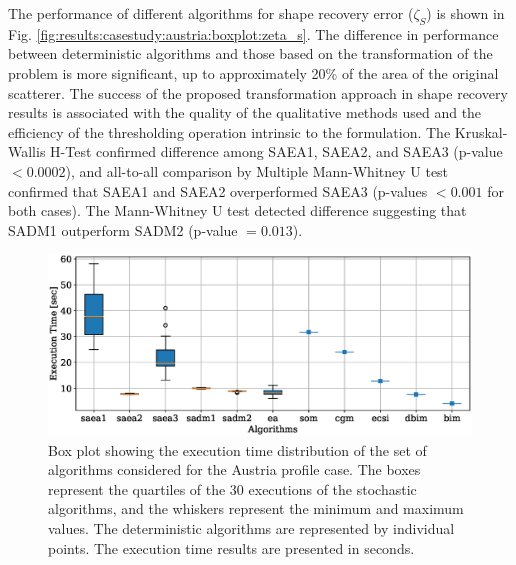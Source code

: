 			
			The performance of different algorithms for shape recovery error ($\zeta_S$) is shown in Fig. \ref{fig:results:casestudy:austria:boxplot:zeta_s}. The difference in performance between deterministic algorithms and those based on the transformation of the problem is more significant, up to approximately 20\% of the area of the original scatterer. The success of the proposed transformation approach in shape recovery results is associated with the quality of the qualitative methods used and the efficiency of the thresholding operation intrinsic to the formulation. The Kruskal-Wallis H-Test confirmed difference among SAEA1, SAEA2, and SAEA3 (p-value $<0.0002$), and all-to-all comparison by Multiple Mann-Whitney U test confirmed that SAEA1 and SAEA2 overperformed SAEA3 (p-values $<0.001$ for both cases). The Mann-Whitney U test detected difference suggesting that SADM1 outperform SADM2 (p-value $=0.013$).
		
			\begin{figure}
				\centering
				\includegraphics[width=.9\textwidth]{./figuras/casestudy/austria/boxplot_time}
				\caption[Box plot showing the execution time distribution of the set of algorithms considered for the Austria profile case.]{Box plot showing the execution time distribution of the set of algorithms considered for the Austria profile case. The boxes represent the quartiles of the 30 executions of the stochastic algorithms, and the whiskers represent the minimum and maximum values. The deterministic algorithms are represented by individual points. The execution time results are presented in seconds.}
				\label{fig:results:casestudy:austria:boxplot:time}
			\end{figure}
		
